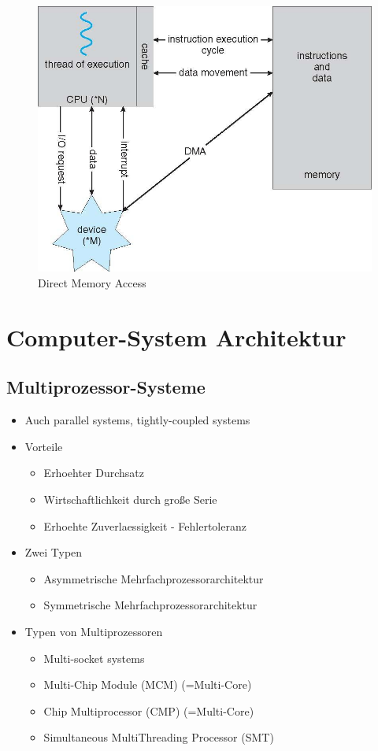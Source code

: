 \documentclass[a4paper]{scrreprt}
\begin{document}
\begin{figure}[ht]
\centering
\includegraphics[scale=0.4]{dma.png}
\caption{Direct Memory Access}
\end{figure}

\section{Computer-System Architektur}
\subsection{Multiprozessor-Systeme}
\begin{itemize}
	\item Auch parallel systems, tightly-coupled systems
	\item Vorteile
		\begin{itemize}
			\item Erhoehter Durchsatz
			\item Wirtschaftlichkeit durch große Serie
			\item Erhoehte Zuverlaessigkeit - Fehlertoleranz
		\end{itemize}
	\item Zwei Typen
		\begin{itemize}
			\item Asymmetrische Mehrfachprozessorarchitektur
			\item Symmetrische Mehrfachprozessorarchitektur
		\end{itemize}
	\item Typen von Multiprozessoren
		\begin{itemize}
			\item Multi-socket systems
			\item Multi-Chip Module (MCM) (=Multi-Core)
			\item Chip Multiprocessor (CMP) (=Multi-Core)
			\item Simultaneous MultiThreading Processor (SMT)
		\end{itemize}
\end{itemize}
\end{document}
